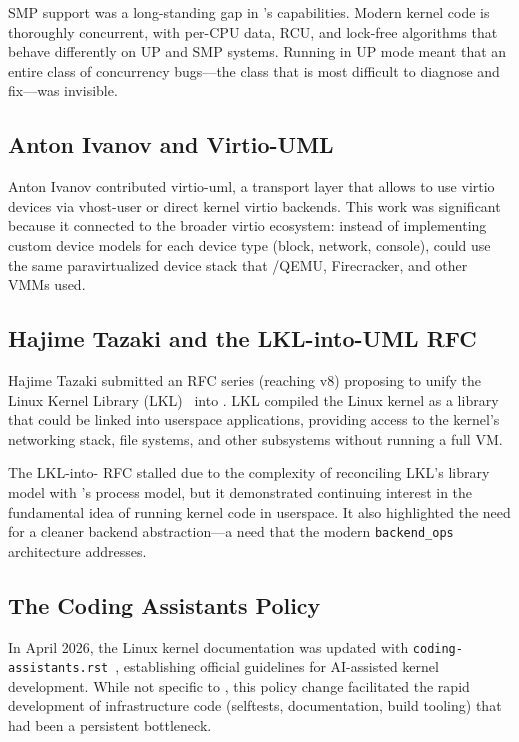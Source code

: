 SMP support was a long-standing gap in \UML{}'s capabilities.  Modern
kernel code is thoroughly concurrent, with per-CPU data, RCU, and lock-free
algorithms that behave differently on UP and SMP systems.  Running \UML{}
in UP mode meant that an entire class of concurrency bugs---the class that
is most difficult to diagnose and fix---was invisible.

\subsection{Anton Ivanov and Virtio-UML}
\label{sec:history-virtio}

Anton Ivanov contributed virtio-uml, a transport layer that allows \UML{}
to use virtio devices via vhost-user or direct kernel virtio backends.
This work was significant because it connected \UML{} to the broader virtio
ecosystem: instead of implementing custom device models for each device
type (block, network, console), \UML{} could use the same paravirtualized
device stack that \KVM{}/QEMU, Firecracker, and other VMMs used.

\subsection{Hajime Tazaki and the LKL-into-UML RFC}
\label{sec:history-lkl}

Hajime Tazaki submitted an RFC series (reaching v8) proposing to unify the
Linux Kernel Library (LKL)~\cite{lkl,tazaki2019} into \UML{}.  LKL
compiled the Linux kernel as a library that could be linked into userspace
applications, providing access to the kernel's networking stack, file
systems, and other subsystems without running a full VM.

The LKL-into-\UML{} RFC stalled due to the complexity of reconciling LKL's
library model with \UML{}'s process model, but it demonstrated continuing
interest in the fundamental idea of running kernel code in userspace.  It
also highlighted the need for a cleaner backend abstraction---a need that
the modern \texttt{backend\_ops} architecture addresses.

\subsection{The Coding Assistants Policy}
\label{sec:history-ai}

In April 2026, the Linux kernel documentation was updated with
\texttt{coding-assistants.rst}~\cite{coding-assistants}, establishing
official guidelines for AI-assisted kernel development.  While not specific
to \UML{}, this policy change facilitated the rapid development of
infrastructure code (selftests, documentation, build tooling) that had been
a persistent bottleneck.

